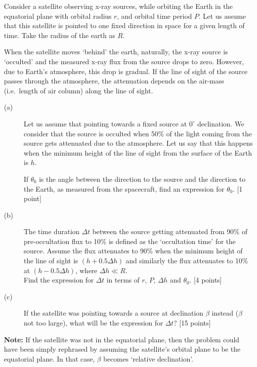 Consider a satellite observing x-ray sources, while orbiting the Earth in the
equatorial plane with orbital radius $r$, and orbital time period $P$. Let us
assume that this satellite is pointed to one fixed direction in space for a
given length of time. Take the radius of the earth as $R$.

When the satellite moves `behind' the earth, naturally, the x-ray source is
`occulted' and the measured x-ray flux from the source drops to zero. However,
due to Earth's atmosphere, this drop is gradual. If the line of sight of the
source passes through the atmosphere, the attenuation depends on the air-mass
(i.e.\ length of air column) along the line of sight.

\begin{description}
\item[(a)] Let us assume that pointing towards a fixed source at $0^\circ$
  declination. We consider that the source is occulted when 50\% of the light
  coming from the source gets attenuated due to the atmosphere. Let us say
  that this happens when the minimum height of the line of sight from the
  surface of the Earth is $h$.

  If $\theta_0$ is the angle between the direction to the source and the
  direction to the Earth, as measured from the spacecraft, find an expression
  for $\theta_0$. \hfill[1 point]
\item[(b)] The time duration $\Delta t$ between the source getting attenuated
  from 90\% of pre-occultation flux to 10\% is defined as the `occultation
  time' for the source. Assume the flux attenuates to 90\% when the minimum
  height of the line of sight is $(h + 0.5\Delta h)$ and similarly the flux
  attenuates to 10\% at $(h - 0.5\Delta h)$, where $\Delta h \ll R$.\\
  Find the expression for $\Delta t$ in terms of $r$, $P$, $\Delta h$ and
  $\theta_0$. \hfill[4 points]
\item[(c)] If the satellite was pointing towards a source at declination
  $\beta$ instead ($\beta$ not too large), what will be the expression for
  $\Delta t$? \hfill[15 points]
\end{description}

\textbf{Note:} If the satellite was not in the equatorial plane, then the
problem could have been simply rephrased by assuming the satellite's orbital
plane to be the equatorial plane. In that case, $\beta$ becomes `relative
declination'.
